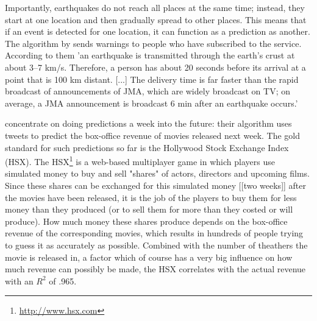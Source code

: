 \documentclass[12pt]{article}
\begin{document}
 Importantly, earthquakes do not reach all places at the same time; instead, they start at one location and then gradually spread to other places. This means that if an event is detected for one location, it can function as a prediction as another. The algorithm by  sends warnings to people who have subscribed to the service. According to them 'an earthquake is transmitted through the earth’s crust at about 3–7 km/s. Therefore, a person has about 20 seconds before its arrival at a point that is 100 km distant. [...] The delivery time is far faster than the rapid broadcast of announcements of JMA, which are widely broadcast on TV; on average, a JMA announcement is broadcast 6 min after an earthquake occurs.'

 concentrate on doing predictions a week into the future: their algorithm uses tweets to predict the box-office revenue of movies released next week. The gold standard for such predictions so far is the Hollywood Stock Exchange Index (HSX). The HSX\footnote{\url{http://www.hsx.com}} is a web-based multiplayer game in which players use simulated money to buy and sell "shares" of actors, directors and upcoming films. Since these shares can be exchanged for this simulated money [[two weeks]] after the movies have been released, it is the job of the players to buy them for less money than they produced (or to sell them for more than they costed or will produce). How much money these shares produce depends on the box-office revenue of the corresponding movies, which results in hundreds of people trying to guess it as accurately as possible. Combined with the number of theathers the movie is released in, a factor which of course has a very big influence on how much revenue can possibly be made, the HSX correlates with the actual revenue with an $R^2$ of .965.
\end{document}
